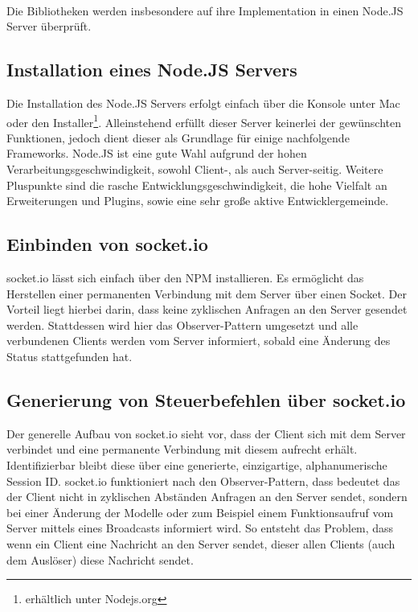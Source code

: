 \\Die Bibliotheken werden insbesondere auf ihre Implementation in einen Node.JS Server überprüft.

	\subsection{Installation eines Node.JS Servers}
	Die Installation des Node.JS Servers erfolgt einfach über die Konsole unter Mac oder den Installer\footnote{erhältlich unter Nodejs.org}. Alleinstehend erfüllt dieser Server keinerlei der gewünschten Funktionen, jedoch dient dieser als Grundlage für einige nachfolgende Frameworks. Node.JS ist eine gute Wahl aufgrund der hohen Verarbeitungsgeschwindigkeit, sowohl Client-, als auch Server-seitig. Weitere Pluspunkte sind die rasche Entwicklungsgeschwindigkeit, die hohe Vielfalt an Erweiterungen und Plugins, sowie eine sehr große aktive Entwicklergemeinde.
	\subsection{Einbinden von socket.io}
	socket.io lässt sich einfach über den NPM installieren. Es ermöglicht das Herstellen einer permanenten Verbindung mit dem Server über einen Socket. Der Vorteil liegt hierbei darin, dass keine zyklischen Anfragen an den Server gesendet werden. Stattdessen wird hier das Observer-Pattern umgesetzt und alle verbundenen Clients werden vom Server informiert, sobald eine Änderung des Status stattgefunden hat. 
	
	\subsection{Generierung von Steuerbefehlen über socket.io}
	Der generelle Aufbau von socket.io sieht vor, dass der Client sich mit dem Server verbindet und eine permanente Verbindung mit diesem aufrecht erhält. Identifizierbar bleibt diese über eine generierte, einzigartige, alphanumerische Session ID. socket.io funktioniert nach den Observer-Pattern, dass bedeutet das der Client nicht in zyklischen Abständen Anfragen an den Server sendet, sondern bei einer Änderung der Modelle oder zum Beispiel einem Funktionsaufruf vom Server mittels eines Broadcasts informiert wird. So entsteht das Problem, dass wenn ein Client eine Nachricht an den Server sendet, dieser allen Clients (auch dem Auslöser) diese Nachricht sendet. 
	
	
